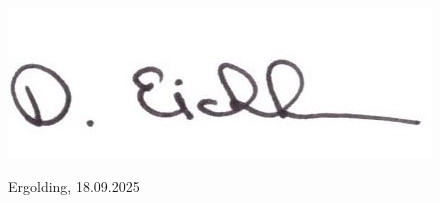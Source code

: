 \documentclass[10pt,a4paper,withhyper]{altacv}
\begin{document}
\begin{paracol}{2}
\vspace{30pt}

\includegraphics[scale=1.9]{Unterschrift_zugeschnitten.jpg}

Ergolding, 18.09.2025



%
%
%
%

%











\end{paracol}
\end{document}
